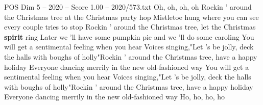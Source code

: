 \begin{textsample}{POS Dim 5 – 2020 – Score 1.00 – 2020/573.txt}  \label{ex:f5_pos_030}
Oh, oh, oh, oh Rockin ' around the Christmas tree at the Christmas party hop Mistletoe hung where you can see every couple tries to stop Rockin ' around the Christmas tree, let the Christmas \textbf{spirit} ring Later we 'll have some pumpkin pie and we 'll do some caroling You will get a sentimental feeling when you hear Voices singing,"Let 's be jolly, deck the halls with boughs of holly"Rockin ' around the Christmas tree, have a happy holiday Everyone dancing merrily in the new old-fashioned way You will get a sentimental feeling when you hear Voices singing,"Let 's be jolly, deck the halls with boughs of holly"Rockin ' around the Christmas tree, have a happy holiday Everyone dancing merrily in the new old-fashioned way Ho, ho, ho, ho

\end{textsample}
